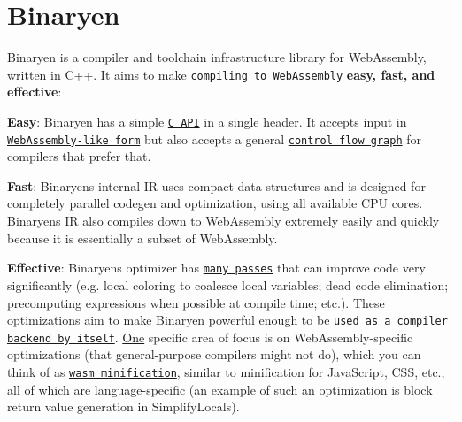 \href{https://travis-ci.org/WebAssembly/binaryen}{\tt } \href{https://ci.appveyor.com/project/WebAssembly/binaryen/branch/master}{\tt }

\section*{Binaryen}

Binaryen is a compiler and toolchain infrastructure library for Web\+Assembly, written in C++. It aims to make \href{https://github.com/WebAssembly/binaryen/wiki/Compiling-to-WebAssembly-with-Binaryen}{\tt compiling to Web\+Assembly} {\bfseries easy, fast, and effective}\+:


\begin{DoxyItemize}
\item {\bfseries Easy}\+: Binaryen has a simple \href{https://github.com/WebAssembly/binaryen/wiki/Compiling-to-WebAssembly-with-Binaryen#c-api-1}{\tt C A\+PI} in a single header. It accepts input in \href{https://github.com/WebAssembly/binaryen/wiki/Compiling-to-WebAssembly-with-Binaryen#what-do-i-need-to-have-in-order-to-use-binaryen-to-compile-to-webassembly}{\tt Web\+Assembly-\/like form} but also accepts a general \href{https://github.com/WebAssembly/binaryen/wiki/Compiling-to-WebAssembly-with-Binaryen#cfg-api}{\tt control flow graph} for compilers that prefer that.
\item {\bfseries Fast}\+: Binaryen\textquotesingle{}s internal IR uses compact data structures and is designed for completely parallel codegen and optimization, using all available C\+PU cores. Binaryen\textquotesingle{}s IR also compiles down to Web\+Assembly extremely easily and quickly because it is essentially a subset of Web\+Assembly.
\item {\bfseries Effective}\+: Binaryen\textquotesingle{}s optimizer has \href{https://github.com/WebAssembly/binaryen/tree/master/src/passes}{\tt many passes} that can improve code very significantly (e.\+g. local coloring to coalesce local variables; dead code elimination; precomputing expressions when possible at compile time; etc.). These optimizations aim to make Binaryen powerful enough to be \href{https://kripken.github.io/talks/binaryen.html#/9}{\tt used as a compiler backend by itself}. \mbox{\hyperlink{struct_one}{One}} specific area of focus is on Web\+Assembly-\/specific optimizations (that general-\/purpose compilers might not do), which you can think of as \href{https://kripken.github.io/talks/binaryen.html#/2}{\tt wasm minification}, similar to minification for Java\+Script, C\+SS, etc., all of which are language-\/specific (an example of such an optimization is block return value generation in {\ttfamily Simplify\+Locals}).
\end{DoxyItemize}

